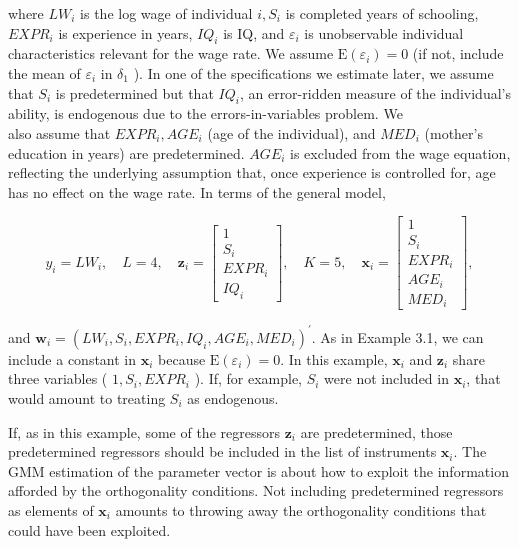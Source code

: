 \documentclass[10pt]{article}
\begin{document}
where $L W_{i}$ is the log wage of individual $i, S_{i}$ is completed years of schooling, $E X P R_{i}$ is experience in years, $I Q_{i}$ is IQ, and $\varepsilon_{i}$ is unobservable individual characteristics relevant for the wage rate. We assume $\mathrm{E}\left(\varepsilon_{i}\right)=0$ (if not, include the mean of $\varepsilon_{i}$ in $\delta_{1}$ ). In one of the specifications we estimate later, we assume that $S_{i}$ is predetermined but that $I Q_{i}$, an error-ridden measure of the individual's ability, is endogenous due to the errors-in-variables problem. We\\
also assume that $E X P R_{i}, A G E_{i}$ (age of the individual), and $M E D_{i}$ (mother's education in years) are predetermined. $A G E_{i}$ is excluded from the wage equation, reflecting the underlying assumption that, once experience is controlled for, age has no effect on the wage rate. In terms of the general model,

$$
y_{i}=L W_{i}, \quad L=4, \quad \mathbf{z}_{i}=\left[\begin{array}{c}
1 \\
S_{i} \\
E X P R_{i} \\
I Q_{i}
\end{array}\right], \quad K=5, \quad \mathbf{x}_{i}=\left[\begin{array}{c}
1 \\
S_{i} \\
E X P R_{i} \\
A G E_{i} \\
M E D_{i}
\end{array}\right],
$$

and $\mathbf{w}_{i}=\left(L W_{i}, S_{i}, E X P R_{i}, I Q_{i}, A G E_{i}, M E D_{i}\right)^{\prime}$. As in Example 3.1, we can include a constant in $\mathbf{x}_{i}$ because $\mathrm{E}\left(\varepsilon_{i}\right)=0$. In this example, $\mathbf{x}_{i}$ and $\mathbf{z}_{i}$ share three variables ( $1, S_{i}, E X P R_{i}$ ). If, for example, $S_{i}$ were not included in $\mathbf{x}_{i}$, that would amount to treating $S_{i}$ as endogenous.

If, as in this example, some of the regressors $\mathbf{z}_{i}$ are predetermined, those predetermined regressors should be included in the list of instruments $\mathbf{x}_{i}$. The GMM estimation of the parameter vector is about how to exploit the information afforded by the orthogonality conditions. Not including predetermined regressors as elements of $\mathbf{x}_{i}$ amounts to throwing away the orthogonality conditions that could have been exploited.
\end{document}
